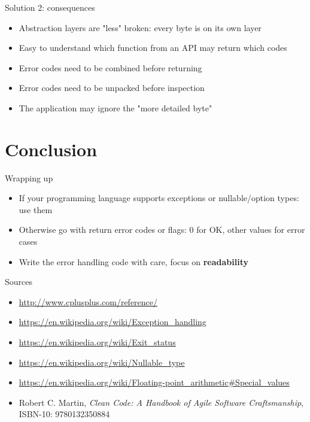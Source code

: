 \documentclass[aspectratio=169,14pt]{beamer}
\begin{document}
\begin{frame}{Solution 2: consequences}
\begin{itemize}
    \item[\good] Abstraction layers are "less" broken: every byte is on its own layer
    \item[\good] Easy to understand which function from an API may return which codes
    \item[\bad] Error codes need to be combined before returning
    \item[\bad] Error codes need to be unpacked before inspection
    \item[\meh] The application may ignore the "more detailed byte"
\end{itemize}
\end{frame}





\section{Conclusion}

\begin{frame}{Wrapping up}
\begin{itemize}
    \item If your programming language supports exceptions or nullable/option types: use them
    \item Otherwise go with return error codes or flags: 0 for OK, other values for error cases
    \item Write the error handling code with care, focus on \textbf{readability}
\end{itemize}
\end{frame}



\begin{frame}{Sources}
\begin{small}
    \begin{itemize}
        \item \url{http://www.cplusplus.com/reference/}
        \item \url{https://en.wikipedia.org/wiki/Exception_handling}
        \item \url{https://en.wikipedia.org/wiki/Exit_status}
        \item \url{https://en.wikipedia.org/wiki/Nullable_type}
        \item \url{https://en.wikipedia.org/wiki/Floating-point_arithmetic\#Special_values}
        \item Robert C. Martin, \textit{Clean Code: A Handbook of Agile Software Craftsmanship}, ISBN-10: 9780132350884 
    \end{itemize}
\end{small}
\end{frame}



\end{document}

